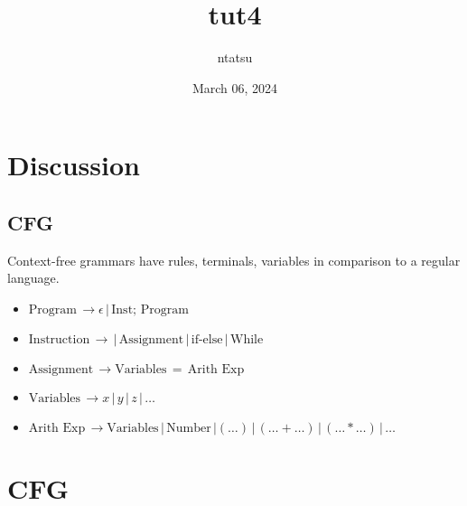 \documentclass{article}
\title{tut4}
\author{ntatsu}
\date{March 06, 2024}
\begin{document}
\maketitle

\section{Discussion}

\subsection{CFG}
Context-free grammars have rules, terminals, variables in comparison to a regular language.
\begin{itemize}
    \item $\text{Program} \, \rightarrow \epsilon \, \vert \, \text{Inst}; \, \text{Program}$
    \item $\text{Instruction} \, \rightarrow \, \vert \, \text{Assignment} \, \vert \, \text{if-else} \, \vert \, \text{While} $
    \item $\text{Assignment} \, \rightarrow \text{Variables}\, = \, \text{Arith Exp}$
    \item $\text{Variables} \, \rightarrow x \, \vert \, y \, \vert \, z \, \vert \, \dots$
    \item $\text{Arith Exp} \, \rightarrow \text{Variables} \, \vert \, \text{Number} \, \vert (\dots) \, \vert \, (\dots + \dots) \, \vert \, (\dots * \dots) \, \vert \, \dots$
\end{itemize}

\section{CFG}

\end{document}
